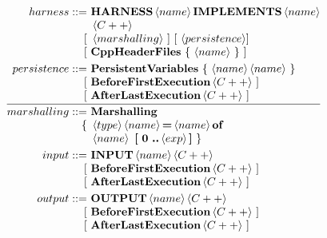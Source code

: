 \begin{align*}
harness  ::=\ &\textbf{HARNESS} \left<name\right> \textbf{IMPLEMENTS} \left<name\right>\\[-0.3em]
              &\left<C++\right>\\[-0.3em]
           [\ &\left<marshalling\right>\ ]\ [\ \left<persistence\right> ]\\[-0.3em]
           [\ &\textbf{CppHeaderFiles}\ \{\ \left<name\right>\ \}\ ]\\
persistence ::=\ &\textbf{PersistentVariables}\ \{\ \left<name\right> \left<name\right>\ \}\\[-0.3em]
              [\ &\textbf{BeforeFirstExecution} \left<C++\right>\ ]\\[-0.3em]
              [\ &\textbf{AfterLastExecution} \left<C++\right>\ ]\\[-1em]
\cline{1-2}\\[-2em]
marshalling ::=\ &\textbf{Marshalling}\\[-0.3em]
          \{\ &\left<type\right> \left<name\right> \textbf{=} \left<name\right> \textbf{of}\\[-0.3em]
              &\left<name\right>\ \textbf{[}\ \textbf{0}\ \textbf{..} \left<exp\right> \textbf{]}\ \}\\
input   ::=\ &\textbf{INPUT} \left<name\right> \left<C++\right>\\[-0.3em]
             [\ &\textbf{BeforeFirstExecution} \left<C++\right>\ ]\\[-0.3em]
             [\ &\textbf{AfterLastExecution} \left<C++\right>\ ]\\
output  ::=\ &\textbf{OUTPUT} \left<name\right> \left<C++\right>\\[-0.3em]
             [\ &\textbf{BeforeFirstExecution} \left<C++\right>\ ]\\[-0.3em]
             [\ &\textbf{AfterLastExecution} \left<C++\right>\ ]
\end{align*}